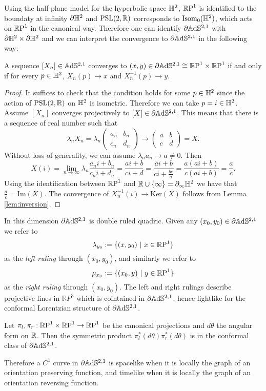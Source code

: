 Using the half-plane model for the hyperbolic space $\H^2$, $\S$ is identified to the boundaty at infinity $\partial \H^2$ and $\PSL$ corresponds to $\text{Isom}_0(\H^2)$, which acts on $\S$ in the canonical way.
Therefore one can identify $\partial \A^{2,1}$ with $\partial \H^2 \times \partial \H^2$ and we can interpret the convergence to $\partial \A^{2,1}$ in the following way:
\begin{lemma} \label{lem:convergence}
    A sequence $[X_n] \in \A^{2,1}$ converges to $(x,y) \in \partial \A^{2,1} \cong \T$ if and only if for every $p\in\H^2$, $X_n(p) \to x$ and $X_n^{-1}(p) \to y$.
\end{lemma}

\begin{proof}
    It suffices to check that the condition holds for some $p\in\H^2$ since the action of $\PSL$ on $\H^2$ is isometric. Therefore we can take $p=i\in\H^2$. Assume $\left[ X_n \right]$ converges projectively to $\left[ X \right] \in \partial\A^{2,1}$. This means that there is a sequence of real number such that
    \[
       \lambda_n X_n = \lambda_n
       \begin{pmatrix}
            a_n & b_n \\ c_n & d_n
        \end{pmatrix} \to
        \begin{pmatrix}
            a & b \\ c & d
        \end{pmatrix} =X.
    \]
    Without loss of generality, we can assume $\lambda_n a_n \to a \neq 0$. Then 
    \[
        X(i) = \lim_{n\to \infty} \lambda_n \frac{a_n i + b_n}{c_n i + d_n} = \frac{ai +b}{ci+d} = \frac{ai + b}{ ci + \frac{bc}{a}} = \frac{a(ai+b)}{c(ai+b)} = \frac{a}{c}.
    \]
    Using the identification between $\S$ and $\R \cup \{ \infty \} = \partial_\infty \H^2$ we have that $\frac{a}{c} = \text{Im}(X)$. The convergence of $X_n^{-1}(i) \to \text{Ker}(X)$ follows from Lemma \ref{lem:inversion}.
\end{proof}

In this dimension $\partial\A^{2,1}$ is double ruled quadric. Given any $(x_0,y_0) \in \partial\A^{2,1}$ we refer to
\[
    \lambda_{y_0} := \{ (x,y_0) \ | \ x \in\S \}
\]
as the \textit{left ruling} through $(x_0,y_0)$, and similarly we refer to
\[
    \mu_{x_0} := \{ (x_0,y) \ | \ y \in\S \}
\]
as the \textit{right ruling} through $(x_0,y_0)$. The left and right rulings describe projective lines in $\mathbb{R}P^3$ which is cointained in $\partial\A^{2,1}$, hence lightlike for the conformal Lorentzian structure of $\partial\A^{2,1}$.
\begin{proposition} \label{prop:angular}
    Let $\pi_l, \pi_r : \T \to\S$ be the canonical projections and $d\theta$ the angular form on $\R$. Then the symmetric product $\pi_l^*(d\theta)\pi_r^*(d\theta)$ is in the conformal class of $\partial\A^{2,1}$.
\end{proposition}
Therefore a $C^1$ curve in $\partial\A^{2,1}$ is spacelike when it is locally the graph of an orientation preserving function, and timelike when it is locally the graph of an orientation reversing function.

